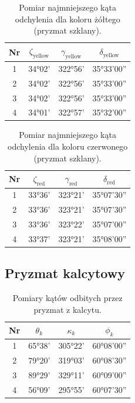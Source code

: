 \documentclass[12pt]{article}
\begin{document}
\begin{table}[H]
    \centering
    \begin{tabular}{c|ccc}
        \toprule
        \textbf{Nr} & $\zeta_{\mathrm{yellow}}$ & $\gamma_{\mathrm{yellow}}$  & $\delta_{\mathrm{yellow}}$ \\
        \midrule
        1 & 34°02'  & 322°56'  & 35°33'00'' \\
        2 & 34°02'  & 322°56'  & 35°33'00'' \\
        3 & 34°02'  & 322°56'  & 35°33'00'' \\
        4 & 34°01'  & 322°57'  & 35°32'00'' \\
        \bottomrule
    \end{tabular}
    \caption{Pomiar najmniejszego kąta odchylenia dla koloru żółtego (pryzmat szklany).}
    \label{tab:katy_odchylenia_szkło_zolty}
\end{table}

\begin{table}[H]
    \centering
    \begin{tabular}{c|ccc}
        \toprule
        \textbf{Nr} & $\zeta_{\mathrm{red}}$ & $\gamma_{\mathrm{red}}$  & $\delta_{\mathrm{red}}$ \\
        \midrule
        1 & 33°36'  & 323°21'  & 35°07'30'' \\
        2 & 33°36'  & 323°21'  & 35°07'30'' \\
        3 & 33°36'  & 323°22'  & 35°07'00'' \\
        4 & 33°37'  & 323°21'  & 35°08'00'' \\
        \bottomrule
    \end{tabular}
    \caption{Pomiar najmniejszego kąta odchylenia dla koloru czerwonego (pryzmat szklany).}
    \label{tab:katy_odchylenia_szkło_czerwony}
\end{table}

\subsection{Pryzmat kalcytowy}

\begin{table}[H]
    \centering
    \begin{tabular}{c|ccc}
        \toprule
        \textbf{Nr} & $\theta_{k}$ & $\kappa_{k}$  & $\phi_{k}$ \\
        \midrule
        1 & 65°38'  & 305°22'  & 60°08'00'' \\
        2 & 79°20'  & 319°03'  & 60°08'30'' \\
        3 & 89°29'  & 329°11'  & 60°09'00'' \\
        4 & 56°09'  & 295°55'  & 60°07'30'' \\
        \bottomrule
    \end{tabular}
    \caption{Pomiary kątów odbitych przez pryzmat z kalcytu.}
    \label{tab:katy_pryzmatu_kalcyt}
\end{table}
\end{document}
